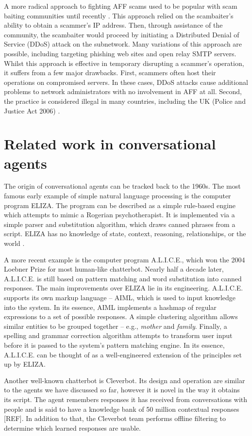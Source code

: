 A more radical approach to fighting AFF scams used to be popular with scam baiting communities until recently \cite{P9}. This approach relied on the scambaiter's ability to obtain a scammer's IP address. Then, through assistance of the community, the scambaiter would proceed by initiating a Distributed Denial of Service (DDoS) attack on the subnetwork. Many variations of this approach are possible, including targeting phishing web sites and open relay SMTP servers. Whilst this approach is effective in temporary disrupting a scammer's operation, it suffers from a few major drawbacks. First, scammers often host their operations on compromised servers. In these cases, DDoS attacks cause additional problems to network administrators with no involvement in AFF at all. Second, the practice is considered illegal in many countries, including the UK (Police and Justice Act 2006) \nocite{P10}.

\section{Related work in conversational agents}
The origin of conversational agents can be tracked back to the 1960s. The most famous early example of simple natural language processing is the computer program ELIZA. The program can be described as a simple rule-based engine which attempts to mimic a Rogerian psychotherapist. It is implemented via a simple parser and substitution algorithm, which draws canned phrases from a script. ELIZA has no knowledge of state, context, reasoning, relationships, or the world \cite{P11}.

A more recent example is the computer program A.L.I.C.E., which won the 2004 Loebner Prize for most human-like chatterbot. Nearly half a decade later, A.L.I.C.E. is still based on pattern matching and word substitution into canned responses. The main improvements over ELIZA lie in its engineering. A.L.I.C.E. supports its own markup language -- AIML, which is used to input knowledge into the system. In its essence, AIML implements a hashmap of regular expressions to a set of possible responses. A simple clustering algorithm allows similar entities to be grouped together -- e.g., \emph{mother} and \emph{family}. Finally, a spelling and grammar correction algorithm attempts to transform user input before it is passed to the system's pattern matching engine. In its essence, A.L.I.C.E. can be thought of as a well-engineered extension of the principles set up by ELIZA.

Another well-known chatterbot is Cleverbot. Its design and operation are similar to the agents we have discussed so far, however it is novel in the way it obtains its script. The agent remembers responses it has received from conversations with people and is said to have a knowledge bank of 50 million contextual responses [REF]. In addition to that, the Cleverbot team performs offline filtering to determine which learned responses are usable.

